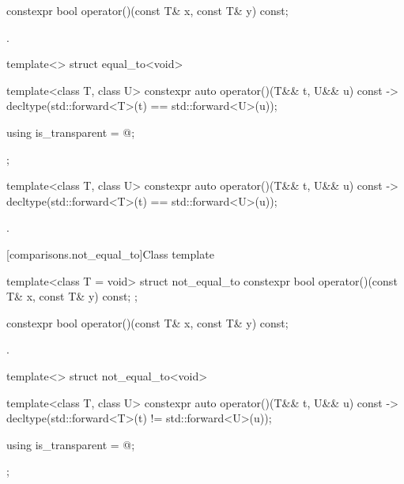 %
\begin{itemdecl}
constexpr bool operator()(const T& x, const T& y) const;
\end{itemdecl}

\begin{itemdescr}
\pnum\returns {}.
\end{itemdescr}

%
\begin{itemdecl}
template<> struct equal_to<void> {
  template<class T, class U> constexpr auto operator()(T&& t, U&& u) const
    -> decltype(std::forward<T>(t) == std::forward<U>(u));

  using is_transparent = @\unspec@;
};
\end{itemdecl}

%
\begin{itemdecl}
template<class T, class U> constexpr auto operator()(T&& t, U&& u) const
    -> decltype(std::forward<T>(t) == std::forward<U>(u));
\end{itemdecl}

\begin{itemdescr}
\pnum\returns {}.
\end{itemdescr}

[comparisons.not_equal_to]{Class template }

%
\begin{itemdecl}
template<class T = void> struct not_equal_to {
  constexpr bool operator()(const T& x, const T& y) const;
};
\end{itemdecl}

%
\begin{itemdecl}
constexpr bool operator()(const T& x, const T& y) const;
\end{itemdecl}

\begin{itemdescr}
\pnum\returns {}.
\end{itemdescr}

%
\begin{itemdecl}
template<> struct not_equal_to<void> {
  template<class T, class U> constexpr auto operator()(T&& t, U&& u) const
    -> decltype(std::forward<T>(t) != std::forward<U>(u));

  using is_transparent = @\unspec@;
};
\end{itemdecl}

